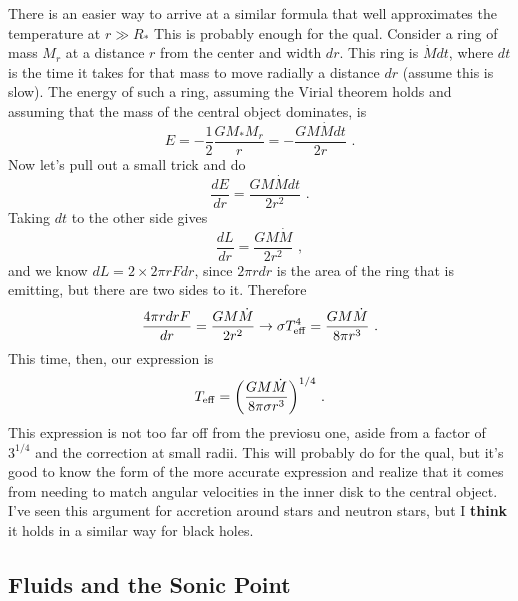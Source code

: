 \begin{enumerate}
      There is an easier way to arrive at a similar formula that well approximates the temperature at $r \gg R_*$ This is probably enough for the qual. Consider a ring of mass $M_r$ at a distance $r$ from the center and width $dr$. This ring is $\dot{M} dt$, where $dt$ is the time it takes for that mass to move radially a distance $dr$ (assume this is slow). The energy of such a ring, assuming the Virial theorem holds and assuming that the mass of the central object dominates, is
      \begin{equation}
      E = -\frac{1}{2} \frac{G M_* M_r}{r} = -\frac{G M \dot{M} dt}{2r}\,\,.
      \end{equation}
      Now let's pull out a small trick and do
      \begin{equation}
      \frac{dE}{dr} = \frac{G M \dot{M}dt}{2r^2}\,\,.
      \end{equation}
      Taking $dt$ to the other side gives
      \begin{equation}
      \frac{dL}{dr} =  \frac{G M \dot{M}}{2r^2}\,\,,
      \end{equation}
      and we know $dL = 2 \times 2 \pi r F dr$, since $2 \pi r dr$ is the area of the ring that is emitting, but there are two sides to it. Therefore
      \begin{equation}
      \frac{4 \pi r dr F}{dr} = \frac{G M \dot{M}}{2r^2} \rightarrow \sigma T_{\rm eff}^4 = \frac{G M \dot{M}}{8 \pi r^3}\,\,.
      \end{equation}
      This time, then, our expression is
      \begin{equation}
      T_{\rm eff} = \biggl(\frac{G M \dot{M}}{8 \pi \sigma r^3}\biggr)^{1/4}\,\,.
      \end{equation}
      This expression is not too far off from the previosu one, aside from a factor of $3^{1/4}$ and the correction at small radii. This will probably do for the qual, but it's good to know the form of the more accurate expression and realize that it comes from needing to match angular velocities in the inner disk to the central object. I've seen this argument for accretion around stars and neutron stars, but I \textbf{think} it holds in a similar way for black holes.
      
\end{enumerate}

\subsection{Fluids and the Sonic Point}


